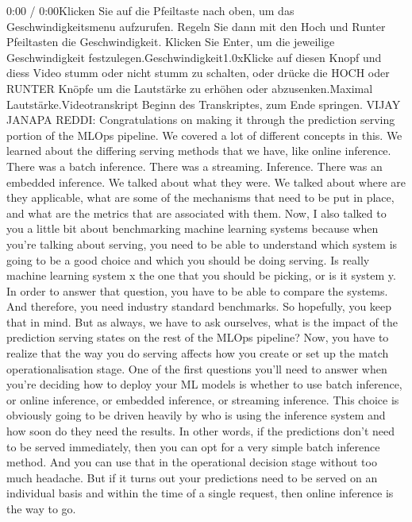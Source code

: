 {{{{{{{{    0:00 / 0:00Klicken Sie auf die Pfeiltaste nach oben, um das Geschwindigkeitsmenu aufzurufen. Regeln Sie dann mit den Hoch und Runter Pfeiltasten die Geschwindigkeit. Klicken Sie Enter, um die jeweilige Geschwindigkeit festzulegen.Geschwindigkeit1.0xKlicke auf diesen Knopf und diess Video stumm oder nicht stumm zu schalten, oder drücke die HOCH oder RUNTER Knöpfe um die Lautstärke zu erhöhen oder abzusenken.Maximal Lautstärke.Videotranskript
    Beginn des Transkriptes, zum Ende springen.
    VIJAY JANAPA REDDI: Congratulations on making it
    through the prediction serving portion of the MLOps pipeline.
    We covered a lot of different concepts in this.
    We learned about the differing serving methods that we have,
    like online inference.
    There was a batch inference.
    There was a streaming.
    Inference.
    There was an embedded inference.
    We talked about what they were.
    We talked about where are they applicable,
    what are some of the mechanisms that need to be put in place,
    and what are the metrics that are associated with them.
    Now, I also talked to you a little bit about benchmarking machine learning
    systems because when you're talking about serving,
    you need to be able to understand which system is going to be a good choice
    and which you should be doing serving.
    Is really machine learning system x the one that you should be picking,
    or is it system y.
    In order to answer that question, you have to be able to compare the systems.
    And therefore, you need industry standard benchmarks.
    So hopefully, you keep that in mind.
    But as always, we have to ask ourselves, what
    is the impact of the prediction serving states
    on the rest of the MLOps pipeline?
    Now, you have to realize that the way you do serving affects how you create
    or set up the match operationalisation stage.
    One of the first questions you'll need to answer
    when you're deciding how to deploy your ML models
    is whether to use batch inference, or online inference, or embedded
    inference, or streaming inference.
    This choice is obviously going to be driven heavily
    by who is using the inference system and how soon do they need the results.
    In other words, if the predictions don't need to be served immediately,
    then you can opt for a very simple batch inference method.
    And you can use that in the operational decision stage
    without too much headache.
    But if it turns out your predictions need
    to be served on an individual basis and within the time of a single request,
    then online inference is the way to go.
}}}}}}}}
